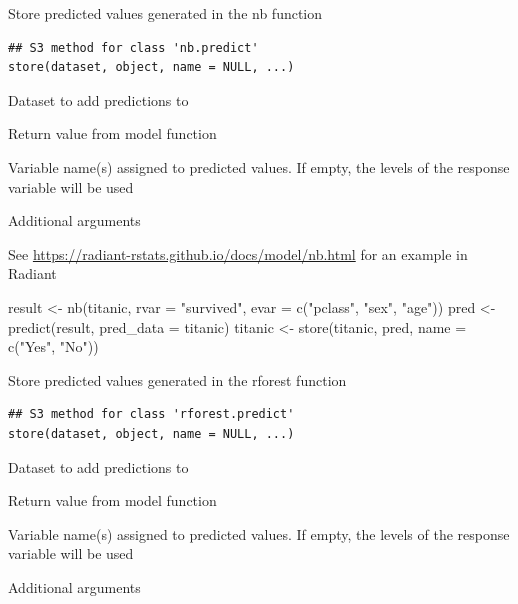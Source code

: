 \documentclass[a4paper]{book}
\begin{document}
%
\begin{Description}
Store predicted values generated in the nb function
\end{Description}
%
\begin{Usage}
\begin{verbatim}
## S3 method for class 'nb.predict'
store(dataset, object, name = NULL, ...)
\end{verbatim}
\end{Usage}
%
\begin{Arguments}
\begin{ldescription}
\item[\code{dataset}] Dataset to add predictions to

\item[\code{object}] Return value from model function

\item[\code{name}] Variable name(s) assigned to predicted values. If empty, the levels of the response variable will be used

\item[\code{...}] Additional arguments
\end{ldescription}
\end{Arguments}
%
\begin{Details}
See \url{https://radiant-rstats.github.io/docs/model/nb.html} for an example in Radiant
\end{Details}
%
\begin{Examples}
\begin{ExampleCode}
result <- nb(titanic, rvar = "survived", evar = c("pclass", "sex", "age"))
pred <- predict(result, pred_data = titanic)
titanic <- store(titanic, pred, name = c("Yes", "No"))

\end{ExampleCode}
\end{Examples}
%
\begin{Description}
Store predicted values generated in the rforest function
\end{Description}
%
\begin{Usage}
\begin{verbatim}
## S3 method for class 'rforest.predict'
store(dataset, object, name = NULL, ...)
\end{verbatim}
\end{Usage}
%
\begin{Arguments}
\begin{ldescription}
\item[\code{dataset}] Dataset to add predictions to

\item[\code{object}] Return value from model function

\item[\code{name}] Variable name(s) assigned to predicted values. If empty, the levels of the response variable will be used

\item[\code{...}] Additional arguments
\end{ldescription}
\end{Arguments}
\end{document}
